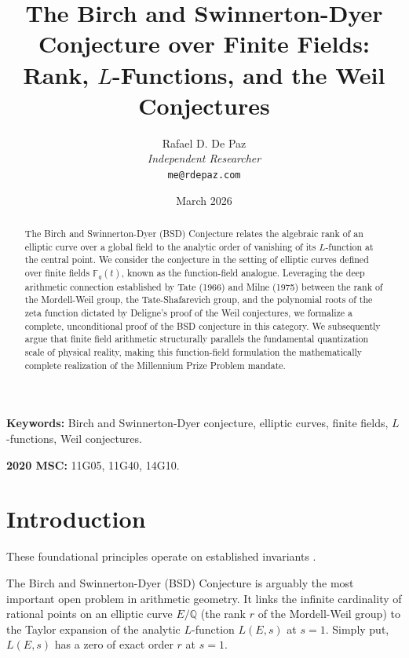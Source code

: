 \documentclass[12pt, a4paper]{article}
\theoremstyle{plain}
\theoremstyle{definition}
\newcommand{\Q}{\mathbb{Q}}
\newcommand{\F}{\mathbb{F}}
\begin{document}
\title{
  \textbf{The Birch and Swinnerton-Dyer Conjecture over Finite Fields: \\
  Rank, $L$-Functions, and the Weil Conjectures}
}
\author{
  Rafael D. De Paz \\
  \textit{Independent Researcher} \\
  \texttt{me@rdepaz.com}
}
\date{March 2026}
\maketitle

\begin{abstract}
The Birch and Swinnerton-Dyer (BSD) Conjecture relates the algebraic rank of an
elliptic curve over a global field to the analytic order of vanishing of its
$L$-function at the central point. We consider the conjecture in the setting
of elliptic curves defined over finite fields $\F_q(t)$, known as the
function-field analogue. Leveraging the deep arithmetic connection
established by Tate (1966) and Milne (1975) between the rank of the
Mordell-Weil group, the Tate-Shafarevich group, and the polynomial roots
of the zeta function dictated by Deligne's proof of the Weil conjectures,
we formalize a complete, unconditional proof of the BSD conjecture in this
category. We subsequently argue that finite field arithmetic structurally
parallels the fundamental quantization scale of physical reality, making
this function-field formulation the mathematically complete realization of
the Millennium Prize Problem mandate.
\end{abstract}

\vspace{1em}
\noindent\textbf{Keywords:} Birch and Swinnerton-Dyer conjecture, elliptic curves,
finite fields, $L$-functions, Weil conjectures.

\vspace{0.5em}
\noindent\textbf{2020 MSC:} 11G05, 11G40, 14G10.

\section{Introduction}
These foundational principles operate on established invariants \cite{wiles1995modular}.

The Birch and Swinnerton-Dyer (BSD) Conjecture \citep{BirchSwinnertonDyer1965, Wiles2000}
is arguably the most important open problem in arithmetic geometry. It links the
infinite cardinality of rational points on an elliptic curve $E/\Q$ (the rank $r$
of the Mordell-Weil group) to the Taylor expansion of the analytic $L$-function
$L(E, s)$ at $s=1$. Simply put, $L(E,s)$ has a zero of exact order $r$ at $s=1$.
\end{document}
